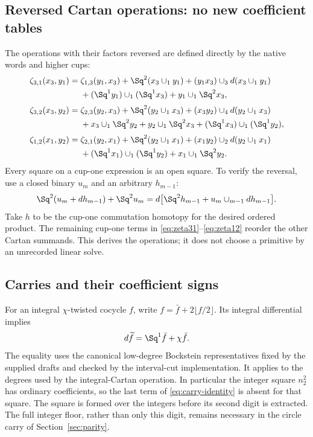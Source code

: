 \subsection{Reversed Cartan operations: no new coefficient tables}
The operations with their factors reversed are defined directly by the native words and higher cups:
\begin{align}\label{eq:zeta31}
\zeta_{3,1}(x_3,y_1)={}&\zeta_{1,3}(y_1,x_3)
 +\Sq^2(x_3\cup_1y_1)
 +(y_1x_3)\cup_3d(x_3\cup_1y_1)\nonumber\\
&+(\Sq^1y_1)\cup_1(\Sq^1x_3)+y_1\cup_1\Sq^2x_3,\\[2pt]
\zeta_{3,2}(x_3,y_2)={}&\zeta_{2,3}(y_2,x_3)
 +\Sq^2(y_2\cup_1x_3)
 +(x_3y_2)\cup_4d(y_2\cup_1x_3)\nonumber\\
&+x_3\cup_1\Sq^2y_2+y_2\cup_1\Sq^2x_3
 +(\Sq^1x_3)\cup_1(\Sq^1y_2),\label{eq:zeta32}\\[2pt]
\zeta_{1,2}(x_1,y_2)={}&\zeta_{2,1}(y_2,x_1)
 +\Sq^2(y_2\cup_1x_1)
 +(x_1y_2)\cup_2d(y_2\cup_1x_1)\nonumber\\
&+(\Sq^1x_1)\cup_1(\Sq^1y_2)+x_1\cup_1\Sq^2y_2.
\label{eq:zeta12}
\end{align}
Every square on a cup-one expression is an open square. To verify the reversal, use a closed binary $u_m$ and an arbitrary $h_{m-1}$:
\begin{equation}\label{eq:reverse-Cartan-proof}
 \Sq^2(u_m+dh_{m-1})+\Sq^2u_m
 =d\big[\Sq^2h_{m-1}+u_m\cup_{m-1}dh_{m-1}\big].
\end{equation}
Take $h$ to be the cup-one commutation homotopy for the desired ordered product. The remaining cup-one terms in \eqref{eq:zeta31}--\eqref{eq:zeta12} reorder the other Cartan summands. This derives the operations; it does not choose a primitive by an unrecorded linear solve.

\subsection{Carries and their coefficient signs}
For an integral $\chi$-twisted cocycle $f$, write $f=\bar f+2\lfloor f/2\rfloor$. Its integral differential implies
\begin{equation}\label{eq:carry-identity}
 d\widetilde f=\Sq^1\bar f+\chi\bar f.
\end{equation}
The equality uses the canonical low-degree Bockstein representatives fixed by the supplied drafts and checked by the interval-cut implementation. It applies to the degrees used by the integral-Cartan operation. In particular the integer square $n_2^2$ has ordinary coefficients, so the last term of \eqref{eq:carry-identity} is absent for that square. The square is formed over the integers before its second digit is extracted. The full integer floor, rather than only this digit, remains necessary in the circle carry of Section~\ref{sec:parity}.

